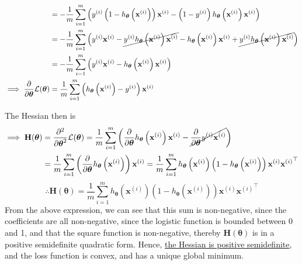 \begin{align*}
     & =
    -\frac{1}{m} \sum_{i=1}^{m}
    \left(
    y^{(i)} \left(1-h_{\boldsymbol{\theta}}\left(\mathbf{x}^{(i)}\right)\right) \mathbf{x}^{(i)}
    -
    \left(1-y^{(i)}\right) h_{\boldsymbol{\theta}}\left(\mathbf{x}^{(i)}\right) \mathbf{x}^{(i)}
    \right)
    \\ & =
    -\frac{1}{m} \sum_{i=1}^{m}
    \Big(
    y^{(i)} \mathbf{x}^{(i)}
    -
    \cancel{y^{(i)} h_{\boldsymbol{\theta}}\left(\mathbf{x}^{(i)}\right) \mathbf{x}^{(i)}}
    -
    h_{\boldsymbol{\theta}}\left(\mathbf{x}^{(i)}\right) \mathbf{x}^{(i)}
    +
    \cancel{y^{(i)} h_{\boldsymbol{\theta}}\left(\mathbf{x}^{(i)}\right) \mathbf{x}^{(i)}}
    \Big)
    \\ & =
    -\frac{1}{m} \sum_{i=1}^{m}
    \left(
    y^{(i)} \mathbf{x}^{(i)}
    -
    h_{\boldsymbol{\theta}}\left(\mathbf{x}^{(i)}\right) \mathbf{x}^{(i)}
    \right)
    \\
    \implies
    \frac{\partial}{\partial \boldsymbol{\theta}} \mathcal{L}(\boldsymbol{\theta})
     & =
    \frac{1}{m} \sum_{i=1}^{m}
    \left(
    h_{\boldsymbol{\theta}}\left(\mathbf{x}^{(i)}\right)
    -
    y^{(i)}
    \right)
    \mathbf{x}^{(i)}
\end{align*}

The Hessian then is
\begin{align*}
    \implies
    \mathbf{H}(\boldsymbol{\theta})
     & =
    \frac{\partial^2}{\partial \boldsymbol{\theta}^2} \mathcal{L}(\boldsymbol{\theta})
    =
    \frac{1}{m} \sum_{i=1}^{m}
    \left(
    \frac{\partial}{\partial \boldsymbol{\theta}} h_{\boldsymbol{\theta}}\left(\mathbf{x}^{(i)}\right) \mathbf{x}^{(i)}
    -
    \cancel{\frac{\partial}{\partial \boldsymbol{\theta}} y^{(i)} \mathbf{x}^{(i)}}
    \right)
    \\ & =
    \frac{1}{m} \sum_{i=1}^{m}
    \left( \frac{\partial}{\partial \boldsymbol{\theta}} h_{\boldsymbol{\theta}}\left(\mathbf{x}^{(i)}\right) \right) \mathbf{x}^{(i)}
    =
    \frac{1}{m} \sum_{i=1}^{m}
    h_{\boldsymbol{\theta}}\left(\mathbf{x}^{(i)}\right) \left(1-h_{\boldsymbol{\theta}}\left(\mathbf{x}^{(i)}\right)\right) \mathbf{x}^{(i)} {\mathbf{x}^{(i)}}^\top
\end{align*}
\begin{equation*}
    \therefore
    \boxed{
    \mathbf{H}(\boldsymbol{\theta})
    =
    \frac{1}{m} \sum_{i=1}^{m}
    h_{\boldsymbol{\theta}}\left(\mathbf{x}^{(i)}\right) \left(1-h_{\boldsymbol{\theta}}\left(\mathbf{x}^{(i)}\right)\right)
    \mathbf{x}^{(i)} {\mathbf{x}^{(i)}}^\top
    }
\end{equation*}
From the above expression, we can see that this sum is non-negative, since the coefficients are all non-negative, since the logistic function is bounded between 0 and 1, and that the square function is non-negative, thereby \( \mathbf{H}(\boldsymbol{\theta}) \) is in a positive semidefinite quadratic form.
Hence, \underline{the Hessian is positive semidefinite}, and the loss function is convex, and has a unique global minimum.

